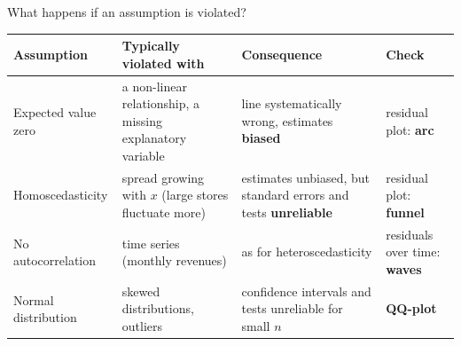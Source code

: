 \documentclass[aspectratio=169,11pt]{beamer}
\begin{document}
\begin{frame}{What happens if an assumption is violated?}
  \footnotesize
  \begin{center}
    \renewcommand{\arraystretch}{1.12}
    \begin{tabular}{@{}>{\raggedright\arraybackslash}p{2.4cm}
                       >{\raggedright\arraybackslash}p{3.7cm}
                       >{\raggedright\arraybackslash}p{4.4cm}
                       >{\raggedright\arraybackslash}p{2.9cm}@{}}
      \toprule
      \textbf{Assumption} & \textbf{Typically violated with} & \textbf{Consequence} & \textbf{Check} \\
      \midrule
      Expected value zero & a non-linear relationship, a missing explanatory
        variable & line systematically wrong, estimates \textbf{biased} &
        residual plot: \textbf{arc} \\
      Homo\-scedasticity & spread growing with $x$ (large stores fluctuate
        more) & estimates unbiased, but standard errors and tests
        \textbf{unreliable} & residual plot: \textbf{funnel} \\
      No auto\-correlation & time series (monthly revenues) & as for
        heteroscedasticity & residuals over time: \textbf{waves} \\
      Normal distribution & skewed distributions, outliers & confidence
        intervals and tests unreliable for small $n$ & \textbf{QQ-plot} \\
      \bottomrule
    \end{tabular}
  \end{center}

\end{frame}
\end{document}
